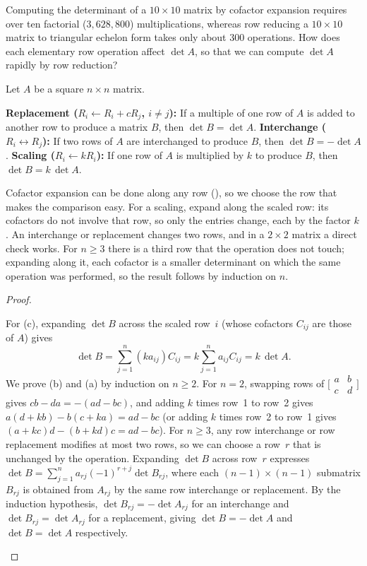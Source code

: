 \documentclass[10pt]{scrartcl}
\begin{document}
\begin{qbox}
  Computing the determinant of a $10\times 10$ matrix by cofactor expansion requires over ten factorial ($3{,}628{,}800$) multiplications, whereas row reducing a $10\times 10$ matrix to triangular echelon form takes only about $300$ operations. How does each elementary row operation affect $\det A$, so that we can compute $\det A$ rapidly by row reduction?
\end{qbox}

\begin{theorem*}
  Let $A$ be a square $n\times n$ matrix.
  \begin{enumerate}[(a)]
    \ii \textbf{Replacement ($R_i\leftarrow R_i+cR_j$, $i\ne j$):} If a multiple of one row of $A$ is added to another row to produce a matrix $B$, then $\det B = \det A$.
    \ii \textbf{Interchange ($R_i\leftrightarrow R_j$):} If two rows of $A$ are interchanged to produce $B$, then $\det B = -\det A$.
    \ii \textbf{Scaling ($R_i\leftarrow kR_i$):} If one row of $A$ is multiplied by $k$ to produce $B$, then $\det B = k\,\det A$.
  \end{enumerate}
\end{theorem*}
\begin{ideabox}
  Cofactor expansion can be done along any row (), so we choose the row that makes the comparison easy. For a scaling, expand along the scaled row: its cofactors do not involve that row, so only the entries change, each by the factor $k$. An interchange or replacement changes two rows, and in a $2\times2$ matrix a direct check works. For $n\ge3$ there is a third row that the operation does not touch; expanding along it, each cofactor is a smaller determinant on which the same operation was performed, so the result follows by induction on $n$.
\end{ideabox}
\begin{proof}
  \begin{steps}
    \ii For (c), expanding $\det B$ across the scaled row~$i$ (whose cofactors $C_{ij}$ are those of $A$) gives
    \[
      \det B=\sum_{j=1}^n (ka_{ij})C_{ij}=k\sum_{j=1}^n a_{ij}C_{ij}=k\,\det A.
    \]
    \ii We prove (b) and (a) by induction on $n\ge 2$. For $n=2$, swapping rows of $\bigl[\begin{smallmatrix}a&b\\c&d\end{smallmatrix}\bigr]$ gives $cb-da=-(ad-bc)$, and adding $k$ times row~1 to row~2 gives $a(d+kb)-b(c+ka)=ad-bc$ (or adding $k$ times row~2 to row~1 gives $(a+kc)d-(b+kd)c=ad-bc$).
    \ii For $n\ge 3$, any row interchange or row replacement modifies at most two rows, so we can choose a row~$r$ that is unchanged by the operation. Expanding $\det B$ across row~$r$ expresses $\det B=\sum_{j=1}^n a_{rj}(-1)^{r+j}\det B_{rj}$, where each $(n-1)\times(n-1)$ submatrix $B_{rj}$ is obtained from $A_{rj}$ by the same row interchange or replacement. By the induction hypothesis, $\det B_{rj}=-\det A_{rj}$ for an interchange and $\det B_{rj}=\det A_{rj}$ for a replacement, giving $\det B=-\det A$ and $\det B=\det A$ respectively.
  \end{steps}
\end{proof}
\end{document}
